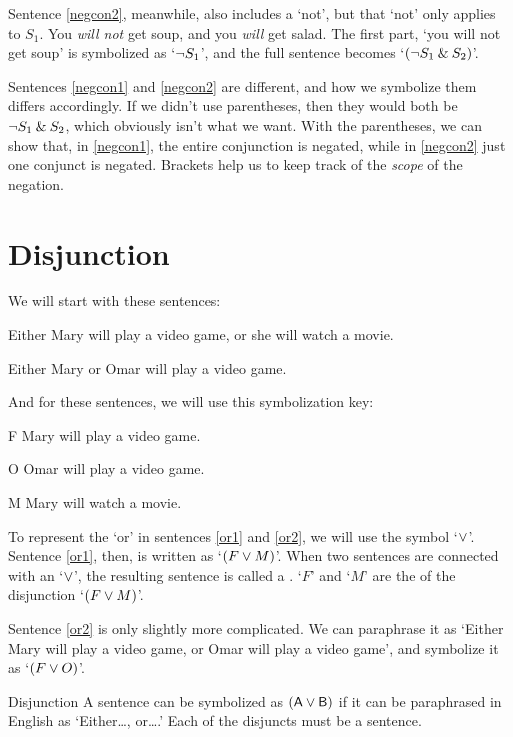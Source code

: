 Sentence \ref{negcon2}, meanwhile, also includes a `not', but that `not' only applies to $S_1$. You \emph{will not} get soup, and you \emph{will} get salad. The first part, `you will not get soup' is symbolized as `${\neg} S_1$', and the full sentence becomes `$({\neg} S_1 \mathbin{\&} S_2)$'. 

Sentences \ref{negcon1} and \ref{negcon2} are different, and how we symbolize them differs accordingly. If we didn't use parentheses, then they would both be ${\neg} S_1 \mathbin{\&} S_2$, which obviously isn't what we want. With the parentheses, we can show that, in \ref{negcon1}, the entire conjunction is negated, while in \ref{negcon2} just one conjunct is negated. Brackets help us to keep track of the \emph{scope} of the negation. 

\section{Disjunction}

We will start with these sentences:
	\begin{earg}
		\item[\ex{or1}]Either Mary will play a video game, or she will watch a movie.
		\item[\ex{or2}]Either Mary or Omar will play a video game. 
	\end{earg}
And for these sentences, we will use this symbolization key:
	\begin{ekey}
		\item[F] Mary will play a video game.
		\item[O] Omar will play a video game.
		\item[M] Mary will watch a movie.
	\end{ekey}
To represent the `or' in sentences \ref{or1} and \ref{or2}, we will use the symbol `$\vee$'. Sentence \ref{or1}, then, is written as `$(F \vee M)$'. When two sentences are connected with an `$\vee$', the resulting sentence is called a . `$F$' and `$M$' are the  of the disjunction `$(F \vee M)$'.

Sentence \ref{or2} is only slightly more complicated. We can paraphrase it as `Either Mary will play a video game, or Omar will play a video game', and symbolize it as `$(F \vee O)$'.

\begin{factboxy}{Disjunction}
		A sentence can be symbolized as $(\mathsf{A}\vee\mathsf{B})$ if it can be paraphrased in English as `Either\ldots, or\ldots.' Each of the disjuncts must be a sentence.
\end{factboxy}


